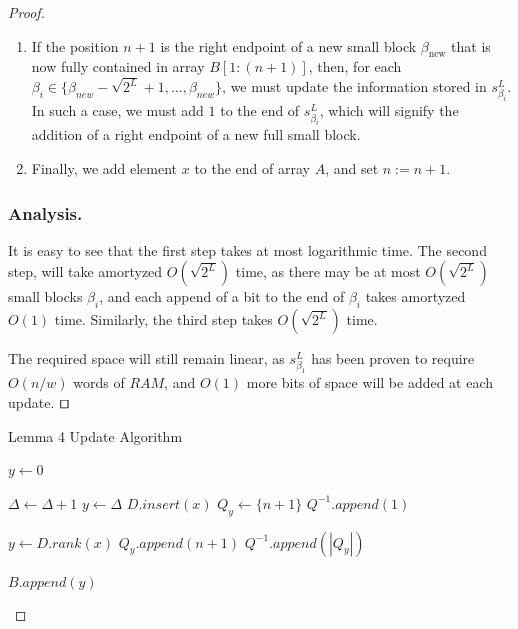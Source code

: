 \documentclass[runningheads]{llncs}
\begin{document}
\begin{proof}
\begin{enumerate}
        \item If the position $n+1$ is the right endpoint of a new small block $\beta_{ \text{new} }$ that is now fully contained in array $B[1:(n+1) ]$, 
        then, for each $\beta_i\in \{ \beta_{new}-\sqrt{2^L}+1, \dots , \beta_{new} \}$,  we must update the information stored in $s^L_{\beta_i}$. 
        In such a case, we must add $1$ to the end of $s^L_{\beta_i}$, which will signify the addition of a right endpoint of a new full small block.  
        
        \item Finally, we add element $x$ to the end of array $A$, and set $n:=n+1$.

    \end{enumerate}

    \subsubsection{Analysis.}
    It is easy to see that the first step takes at most logarithmic time. The second step, will take amortyzed $O(\sqrt{2^L})$  time, as there may be at most $O(\sqrt{2^L})$ small blocks $\beta_i$, 
    and each append of a bit to the end of $\beta_i$ takes amortyzed $O(1)$ time. Similarly, the third step takes $O(\sqrt{2^L})$ time.

    The required space will still remain linear, as $s^L_{\beta_1}$ has been proven to require $O(n/w)$ words of $RAM$, and $O(1)$ more bits of space will be added at each update. $\qed$

    \begin{algorithm}[H]
        \caption{Lemma 4 Update Algorithm}\label{lemma4Update}
        \begin{algorithmic}[1]
        
        
        \State $y\gets 0$

        
        \State $\Delta\gets \Delta+1$
        \State $y\gets \Delta$
        \State $D.insert(x)$
        \State $Q_{y}\gets \{n+1\}$
        \State $Q^{-1}.append(1)$

        \Else{}
        
        \State $y \gets D.rank(x)$
        \State $Q_{y}.append(n+1)$
        \State $Q^{-1}.append(|Q_{y}|)$

        \EndIf

        \State $B.append(y)$


\end{algorithmic}
\end{algorithm}
\end{proof}
\end{document}
